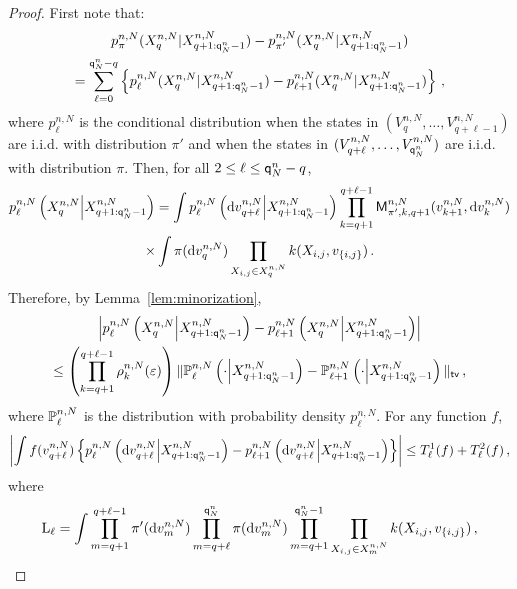 \begin{proof}
First note that:
\begin{multline*}
p_{\pi}^{n,N}(X_{q}^{n,N}|X_{q+1:{\mathsf{q}}^{n}_{N}-1}^{n,N}) - p_{\pi'}^{n,N}(X_{q}^{n,N}|X_{q+1:{\mathsf{q}}^{n}_{N}-1}^{n,N}) \\ = \sum_{\ell= 0}^{{\mathsf{q}}^{n}_{N}-q}\left\{p_{\ell}^{n,N}(X_{q}^{n,N}|X_{q+1:{\mathsf{q}}^{n}_{N}-1}^{n,N}) - p_{\ell+1}^{n,N}(X_{q}^{n,N}|X_{q+1:{\mathsf{q}}^{n}_{N}-1}^{n,N})\right\}\,,
\end{multline*}
where $p_{\ell}^{n,N}$ is the conditional distribution when the states in $(V_q^{n,N},\ldots,V_{q+\ell-1}^{n,N})$ are i.i.d. with distribution $\pi'$ and when the states in $(V_{q+\ell}^{n,N},\ldots,V_{{\mathsf{q}}^{n}_{N}}^{n,N})$ are i.i.d. with distribution $\pi$. Then, for all $2\le \ell \le {\mathsf{q}}^{n}_{N}-q$,
\begin{multline*}
p_{\ell}^{n,N}\left(X^{n,N}_{q}\middle|X^{n,N}_{q+1:{\mathsf{q}}^{n}_{N}-1}\right) = \int p^{n,N}_{\ell}\left(\mathrm{d} v_{q+\ell}^{n,N}\middle | X^{n,N}_{q+1:{\mathsf{q}}^{n}_{N}-1}\right) \prod_{k = q+1}^{q+\ell-1}\mathsf{M}^{n,N}_{\pi',k,q+1}(v_{k+1}^{n,N},\mathrm{d} v_k^{n,N})\\
\times\int \pi(\mathrm{d} v_q^{n,N})\prod_{X_{i,j}\in X_{q}^{n,N}}k(X_{i,j},v_{\{i,j\}})\,.
\end{multline*}
Therefore, by Lemma~\ref{lem:minorization},
\begin{multline*}
\left|p_{\ell}^{n,N}\left(X^{n,N}_{q}\middle|X^{n,N}_{q+1:{\mathsf{q}}^{n}_{N}-1}\right)-p_{\ell+1}^{n,N}\left(X^{n,N}_{q}\middle|X^{n,N}_{q+1:{\mathsf{q}}^{n}_{N}-1}\right)\right|\\
\le \left(\prod_{k = q+1}^{q+\ell-1}\rho^{n,N}_k(\varepsilon)\right)\|\mathbb{P}^{n,N}_{\ell}\left(\cdot\middle | X^{n,N}_{q+1:{\mathsf{q}}^{n}_{N}-1}\right)-\mathbb{P}^{n,N}_{\ell+1}\left(\cdot\middle | X^{n,N}_{q+1:{\mathsf{q}}^{n}_{N}-1}\right)\|_{\mathsf{tv}}\,,
\end{multline*}
where $\mathbb{P}^{n,N}_{\ell}$ is the distribution with probability density $p^{n,N}_{\ell}$. For any function $f$,
\[
\left|\int f(v_{q+\ell}^{n,N})\left\{p^{n,N}_{\ell}\left(\mathrm{d} v_{q+\ell}^{n,N}\middle | X^{n,N}_{q+1:{\mathsf{q}}^{n}_{N}-1}\right)-p^{n,N}_{\ell+1}\left(\mathrm{d} v_{q+\ell}^{n,N}\middle | X^{n,N}_{q+1:{\mathsf{q}}^{n}_{N}-1}\right)\right\}\right|\le T^1_{\ell}(f) + T^2_{\ell}(f)\,,
\]
where
\begin{align*}
\mathrm{L}_{\ell}&= \int \prod_{m=q+1}^{q+\ell-1}\pi'(\rmd v^{n,N}_m)\prod_{m=q+\ell}^{\ordermax{n}{N}}\pi(\rmd v^{n,N}_m)\prod_{m=q+1}^{\ordermax{n}{N}-1}\prod_{X_{i,j}\in X^{n,N}_m}\condlik(X_{i,j},v_{\{i,j\}})\eqsp,\\

\end{align*}
\end{proof}
